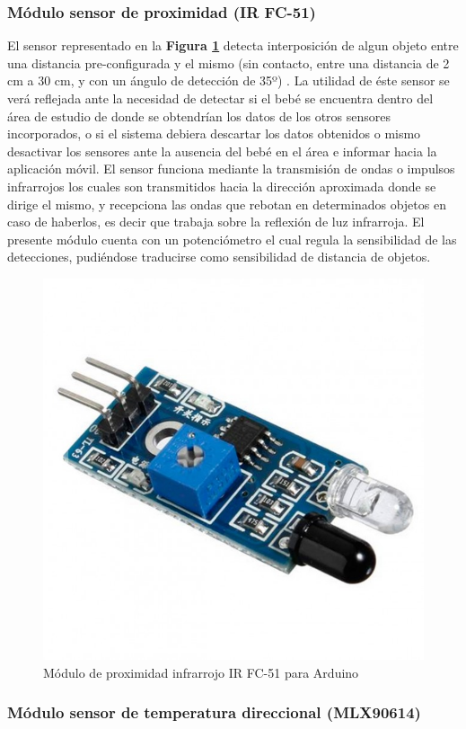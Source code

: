 \documentclass{IEEEtran}
\begin{document}
			\subsubsection{Módulo sensor de proximidad (\textbf{IR FC-51})}

				El sensor representado en la \textbf{Figura \ref{arduino-modulo-proximidad}} detecta interposición de algun objeto entre una distancia pre-configurada y el mismo (sin contacto, entre una distancia de 2 cm a 30 cm, y con un ángulo de detección de 35º) \cite{proximidadtecnico}. La utilidad de éste sensor se verá reflejada ante la necesidad de detectar si el bebé se encuentra dentro del área de estudio de donde se obtendrían los datos de los otros sensores incorporados, o si el sistema debiera descartar los datos obtenidos o mismo desactivar los sensores ante la ausencia del bebé en el área e informar hacia la aplicación móvil. El sensor funciona mediante la transmisión de ondas o impulsos infrarrojos los cuales son transmitidos hacia la dirección aproximada donde se dirige el mismo, y recepciona las ondas que rebotan en determinados objetos en caso de haberlos, es decir que trabaja sobre la reflexión de luz infrarroja. El presente módulo cuenta con un potenciómetro el cual regula la sensibilidad de las detecciones, pudiéndose traducirse como sensibilidad de distancia de objetos. 

				\begin{figure}
					\centering
					\includegraphics[width=0.5\linewidth]{arduino-modulo-proximidad}
					\caption{Módulo de proximidad infrarrojo IR FC-51 para Arduino}
					\label{arduino-modulo-proximidad}
				\end{figure}

			\subsubsection{Módulo sensor de temperatura direccional (\textbf{MLX90614})}
			
\end{document}
